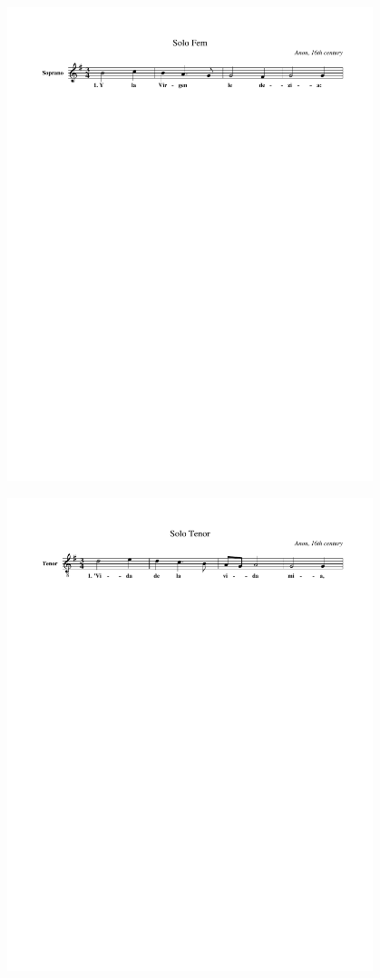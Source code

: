 \documentclass[a4paper,UKenglish]{oasics}
\begin{document}
\vspace{-1.30cm}
\begin{center}
  \includegraphics[width=0.8\textwidth, clip=true, trim = 15mm 231mm 0mm 0mm]{img/201.pdf} 
\end{center}



\vspace{-1.30cm}
\begin{center}
  \includegraphics[width=0.8\textwidth, clip=true, trim = 15mm 231mm 0mm 0mm]{img/303.pdf} 
\end{center}
\end{document}
